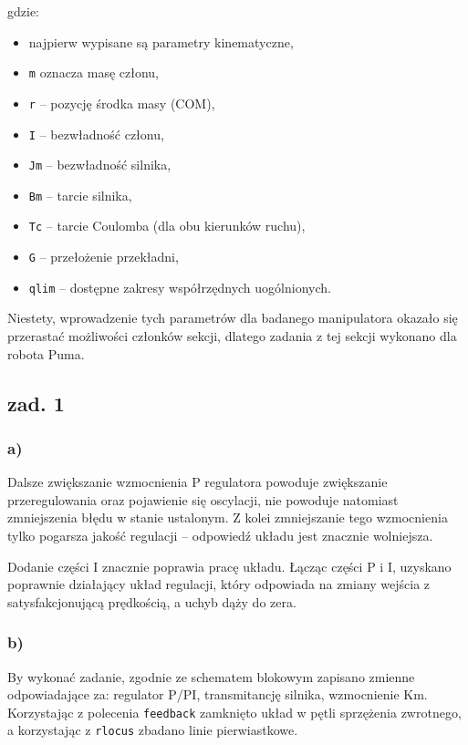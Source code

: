 \documentclass[11pt, a4paper]{article}
\begin{document}
gdzie:
\begin{itemize}
\item najpierw wypisane są parametry kinematyczne,
\item \texttt{m} oznacza masę członu,
\item \texttt{r} -- pozycję środka masy (COM),
\item \texttt{I} -- bezwładność członu,
\item \texttt{Jm} -- bezwładność silnika,
\item \texttt{Bm} -- tarcie silnika,
\item \texttt{Tc} -- tarcie Coulomba (dla obu kierunków ruchu),
\item \texttt{G} -- przełożenie przekładni,
\item \texttt{qlim} -- dostępne zakresy współrzędnych uogólnionych.
\end{itemize}

Niestety, wprowadzenie tych parametrów dla badanego manipulatora okazało się przerastać możliwości członków sekcji, dlatego zadania z tej sekcji wykonano dla robota Puma.

\subsection*{zad. 1}

\subsubsection*{a)}

Dalsze zwiększanie wzmocnienia P regulatora powoduje zwiększanie przeregulowania oraz pojawienie się oscylacji, nie powoduje natomiast zmniejszenia błędu w stanie ustalonym. Z kolei zmniejszanie tego wzmocnienia tylko pogarsza jakość regulacji -- odpowiedź układu jest znacznie wolniejsza.

Dodanie części I znacznie poprawia pracę układu. Łącząc części P i I, uzyskano poprawnie działający układ regulacji, który odpowiada na zmiany wejścia z satysfakcjonującą prędkością, a uchyb dąży do zera.

\subsubsection*{b)}

By wykonać zadanie, zgodnie ze schematem blokowym zapisano zmienne odpowiadające za: regulator P/PI, transmitancję silnika, wzmocnienie Km. Korzystając z polecenia \texttt{feedback} zamknięto układ w pętli sprzężenia zwrotnego, a korzystając z \texttt{rlocus} zbadano linie pierwiastkowe.
\end{document}
